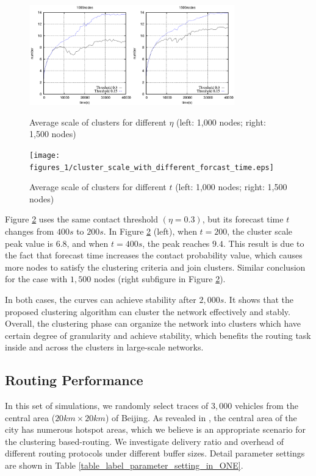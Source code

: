 \documentclass[conference]{IEEEtran}
\begin{document}
\begin{figure}[!t]
\centering
  \includegraphics[width=3.5in]{figures_1/cluster_scale_with_different_threshold.eps}\\
  \caption{Average scale of clusters for different $\eta$ (left: 1,000 nodes; right: 1,500 nodes)}\label{figure_label_Scale_with_different_eta}
\end{figure}
\begin{figure}[!t]
\centering
  \texttt{[image: figures\_1/cluster\_scale\_with\_different\_forcast\_time.eps]}\\
  \caption{Average scale of clusters for different $t$ (left: 1,000 nodes; right: 1,500 nodes)}\label{figure_label_average_scale_w_t}
\end{figure}

Figure \ref{figure_label_average_scale_w_t} uses the same contact threshold $(\eta=0.3)$, but its forecast time $t$ changes from $400s$ to $200s$. In Figure \ref{figure_label_average_scale_w_t} (left), when $t=200$, the cluster scale peak value is $6.8$, and when $t=400s$, the peak reaches $9.4$. This result is due to the fact that forecast time increases the contact probability value, which causes more nodes to satisfy the clustering criteria and join clusters. Similar conclusion for the case with $1,500$ nodes (right subfigure in Figure \ref{figure_label_average_scale_w_t}).

In both cases, the curves can achieve stability after $2,000s$. It shows that the proposed clustering algorithm can cluster the network effectively and stably. Overall, the clustering phase can organize the network into clusters which have certain degree of granularity and achieve stability, which benefits the routing task inside and across the clusters in large-scale networks.

\subsection{Routing Performance}

In this set of simulations, we randomly select traces of $3,000$ vehicles from the central area ($20km \times 20km$) of Beijing. As revealed in \cite{vHuWang-23},  the central area of the city has numerous hotspot areas, which we believe is an appropriate scenario for the clustering based-routing. We investigate delivery ratio and overhead of different routing protocols under different buffer sizes. Detail parameter settings are shown in Table \ref{table_label_parameter_setting_in_ONE}.
\end{document}
